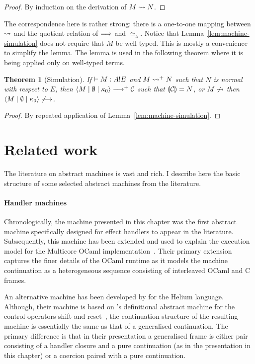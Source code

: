 \documentclass[12pt,phd,lfcs,twoside,openright,logo,leftchapter,normalheadings]{infthesis}
\theoremstyle{plain}
\newtheorem{theorem}{Theorem}[chapter]
\theoremstyle{definition}
\begin{document}
%
\begin{proof}
By induction on the derivation of $M \leadsto N$.
\end{proof}
%
The correspondence here is rather strong: there is a one-to-one
mapping between $\leadsto$ and the quotient relation of $\Longrightarrow$
and $\simeq_{\textrm{a}}$. %
%
Notice that Lemma~\ref{lem:machine-simulation} does not require that
$M$ be well-typed. This is mostly a convenience to simplify the
lemma. The lemma is used in the following theorem where it is being
applied only on well-typed terms.
%
\begin{theorem}[Simulation]\label{thm:handler-simulation}
  If $\vdash M : A ! E$ and $M \leadsto^+ N$ such that $N$ is
  normal with respect to $E$, then
  $\langle M \mid \emptyset \mid \kappa_0 \rangle \longrightarrow^+ \mathcal{C}$ such that
  $\llparenthesis \mathcal{C} \rrparenthesis = N$, or $M \not\leadsto$ then
  $\langle M \mid \emptyset \mid \kappa_0 \rangle \not\longrightarrow$.
\end{theorem}
%
\begin{proof}
By repeated application of Lemma~\ref{lem:machine-simulation}.
\end{proof}

\section{Related work}
The literature on abstract machines is vast and rich. I describe here
the basic structure of some selected abstract machines from the
literature.

\paragraph{Handler machines} Chronologically, the machine presented in
this chapter was the first abstract machine specifically designed for
effect handlers to appear in the literature. Subsequently, this
machine has been extended and used to explain the execution model for
the Multicore OCaml
implementation~\cite{SivaramakrishnanDWKJM21}. Their primary extension
captures the finer details of the OCaml runtime as it models the
machine continuation as a heterogeneous sequence consisting of
interleaved OCaml and C frames.

An alternative machine has been developed by \citet{BiernackiPPS19}
for the Helium language. Although, their machine is based on
\citeauthor{BiernackaBD05}'s definitional abstract machine for the
control operators shift and reset~\cite{BiernackaBD05}, the
continuation structure of the resulting machine is essentially the
same as that of a generalised continuation. The primary difference is
that in their presentation a generalised frame is either pair
consisting of a handler closure and a pure continuation (as in the
presentation in this chapter) or a coercion paired with a pure
continuation.
\end{document}
